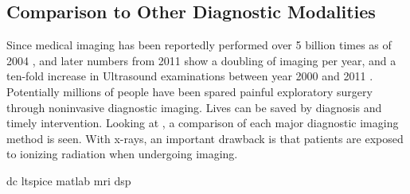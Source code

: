 \subsection{Comparison to Other Diagnostic Modalities}
Since medical imaging has been reportedly performed over 5 billion times as of 2004 \cite{Picano2004}, and later numbers from 2011 show a doubling of imaging per year, and a ten-fold increase in Ultrasound examinations between year 2000 and 2011 \cite{Szabo_UltrasoundBook_2}. Potentially millions of people have been spared painful exploratory surgery through noninvasive diagnostic imaging. Lives can be saved by diagnosis and timely intervention. Looking at , a comparison of each major diagnostic imaging method is seen. 
With x-rays, an important drawback is that patients are exposed to ionizing radiation when undergoing imaging. 
\cite{ShungUltrasound_Book,Shung1976,JensenUltrasoundBook,Jensen_Algorithms}
\cite{1999_SummerSchool_Notes,Szabo_UltrasoundBook_2}

\gls{dc} \gls{ltspice} \gls{matlab} \gls{mri} \gls{dsp}


